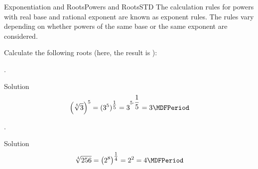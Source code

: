 \begin{MXContent}{Exponentiation and Roots}{Powers and Roots}{STD}
The calculation rules for powers with real base and rational exponent are known as exponent rules. The rules vary depending on 
whether powers of the same base or the same exponent are considered.

\begin{MExercise}
Calculate the following roots (here, the result is 
):
\begin{MExerciseItems}
\item{.\\\begin{MHint}{Solution} $$\left(\sqrt[5]{3}\right)^5=(3^5)^{\Mtfrac15}=3^{5\cdot \Mdfrac15}=3 \MDFPeriod$$\end{MHint}}
\item{.\\\begin{MHint}{Solution} $$\sqrt[4]{256}=\left({2^8}\right)^{\Mtfrac14}=2^2=4 \MDFPeriod$$\end{MHint}}
\end{MExerciseItems}
\end{MExercise}

\end{MXContent}

